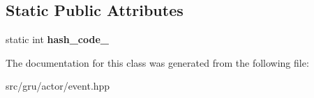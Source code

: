 \subsection*{\-Static \-Public \-Attributes}
\begin{DoxyCompactItemize}
\item 
\hypertarget{classNeb_1_1Event_1_1Actor_1_1Base_ab6711b6cd077caa473f0c3b7416a265f}{static int {\bfseries hash\-\_\-code\-\_\-}}\label{classNeb_1_1Event_1_1Actor_1_1Base_ab6711b6cd077caa473f0c3b7416a265f}

\end{DoxyCompactItemize}


\-The documentation for this class was generated from the following file\-:\begin{DoxyCompactItemize}
\item 
src/gru/actor/event.\-hpp\end{DoxyCompactItemize}
